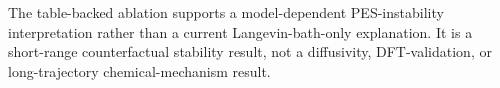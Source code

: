 The table-backed ablation supports a model-dependent PES-instability interpretation rather than a current Langevin-bath-only explanation. It is a short-range counterfactual stability result, not a diffusivity, DFT-validation, or long-trajectory chemical-mechanism result.
